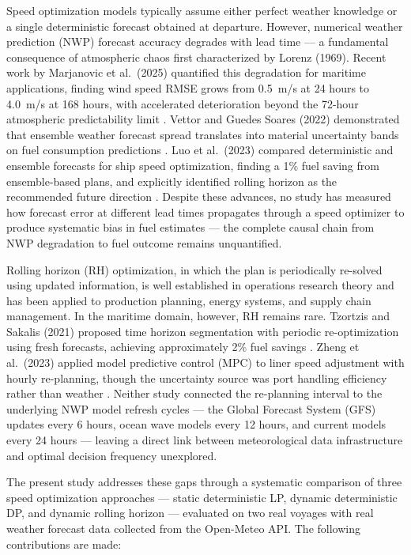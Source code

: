 \documentclass[review]{elsarticle}
\begin{document}
Speed optimization models typically assume either perfect weather knowledge or a single deterministic forecast obtained at departure. However, numerical weather prediction (NWP) forecast accuracy degrades with lead time --- a fundamental consequence of atmospheric chaos first characterized by Lorenz (1969). Recent work by Marjanovic et al.\ (2025) quantified this degradation for maritime applications, finding wind speed RMSE grows from 0.5~m/s at 24 hours to 4.0~m/s at 168 hours, with accelerated deterioration beyond the 72-hour atmospheric predictability limit \cite{Marjanovic2025}. Vettor and Guedes Soares (2022) demonstrated that ensemble weather forecast spread translates into material uncertainty bands on fuel consumption predictions \cite{Vettor2022}. Luo et al.\ (2023) compared deterministic and ensemble forecasts for ship speed optimization, finding a 1\% fuel saving from ensemble-based plans, and explicitly identified rolling horizon as the recommended future direction \cite{Luo2023}. Despite these advances, no study has measured how forecast error at different lead times propagates through a speed optimizer to produce systematic bias in fuel estimates --- the complete causal chain from NWP degradation to fuel outcome remains unquantified.

Rolling horizon (RH) optimization, in which the plan is periodically re-solved using updated information, is well established in operations research theory \cite{Sethi1991} and has been applied to production planning, energy systems, and supply chain management. In the maritime domain, however, RH remains rare. Tzortzis and Sakalis (2021) proposed time horizon segmentation with periodic re-optimization using fresh forecasts, achieving approximately 2\% fuel savings \cite{Tzortzis2021}. Zheng et al.\ (2023) applied model predictive control (MPC) to liner speed adjustment with hourly re-planning, though the uncertainty source was port handling efficiency rather than weather \cite{Zheng2023}. Neither study connected the re-planning interval to the underlying NWP model refresh cycles --- the Global Forecast System (GFS) updates every 6 hours, ocean wave models every 12 hours, and current models every 24 hours --- leaving a direct link between meteorological data infrastructure and optimal decision frequency unexplored.

The present study addresses these gaps through a systematic comparison of three speed optimization approaches --- static deterministic LP, dynamic deterministic DP, and dynamic rolling horizon --- evaluated on two real voyages with real weather forecast data collected from the Open-Meteo API. The following contributions are made:
\end{document}
